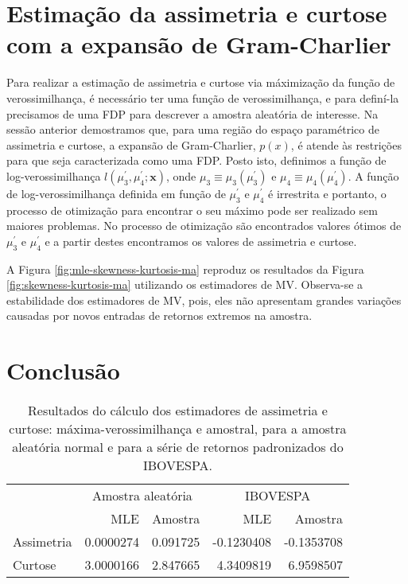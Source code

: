 \documentclass[]{article}
\begin{document}
\section{Estimação da assimetria e curtose com a expansão de
Gram-Charlier}\label{estimacao-da-assimetria-e-curtose-com-a-expansao-de-gram-charlier}

Para realizar a estimação de assimetria e curtose via máximização da
função de verossimilhança, é necessário ter uma função de
verossimilhança, e para definí-la precisamos de uma FDP para descrever a
amostra aleatória de interesse. Na sessão anterior demostramos que, para
uma região do espaço paramétrico de assimetria e curtose, a expansão de
Gram-Charlier, \(p(x)\), é atende às restrições para que seja
caracterizada como uma FDP. Posto isto, definimos a função de
log-verossimilhança \(l(\mu_3^\prime, \mu_4^\prime; \mathbf{x})\), onde
\(\mu_3 \equiv \mu_3(\mu_3^\prime)\) e
\(\mu_4 \equiv \mu_4(\mu_4^\prime)\). A função de log-verossimilhança
definida em função de \(\mu_3^\prime\) e \(\mu_4^\prime\) é irrestrita e
portanto, o processo de otimização para encontrar o seu máximo pode ser
realizado sem maiores problemas. No processo de otimização são
encontrados valores ótimos de \(\mu_3^\prime\) e \(\mu_4^\prime\) e a
partir destes encontramos os valores de assimetria e curtose.

A Figura \ref{fig:mle-skewness-kurtosis-ma} reproduz os resultados da
Figura \ref{fig:skewness-kurtosis-ma} utilizando os estimadores de MV.
Observa-se a estabilidade dos estimadores de MV, pois, eles não
apresentam grandes variações causadas por novos entradas de retornos
extremos na amostra.

\section{Conclusão}\label{conclusao}

\begin{table}

\caption{\label{tab:unnamed-chunk-14}Resultados do cálculo dos estimadores de assimetria e curtose: máxima-verossimilhança e amostral, para a amostra aleatória normal e para a série de retornos padronizados do IBOVESPA.}
\centering
\begin{tabular}[t]{lrrrr}
\toprule
\multicolumn{1}{c}{ } & \multicolumn{2}{c}{Amostra aleatória} & \multicolumn{2}{c}{IBOVESPA} \\
\cmidrule(l{2pt}r{2pt}){2-3} \cmidrule(l{2pt}r{2pt}){4-5}
  & MLE & Amostra & MLE & Amostra\\
\midrule
Assimetria & 0.0000274 & 0.091725 & -0.1230408 & -0.1353708\\
Curtose & 3.0000166 & 2.847665 & 4.3409819 & 6.9598507\\
\bottomrule
\end{tabular}
\end{table}
\end{document}
